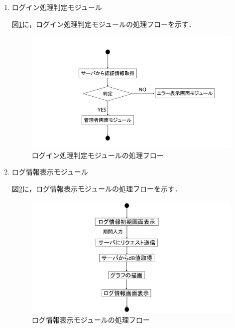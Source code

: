 \begin{enumerate}
\item ログイン処理判定モジュール

図\ref{fig;2-3}に，ログイン処理判定モジュールの処理フローを示す．

\begin{figure}[H]
	\begin{center}
	\includegraphics[width=15cm, bb=0 0 1000 540, clip]{./app_pic/app2-3.pdf}
	\caption{ログイン処理判定モジュールの処理フロー}
	\label{fig;2-3}
	\end{center}
\end{figure}

\item ログ情報表示モジュール

図\ref{fig;2-6}に，ログ情報表示モジュールの処理フローを示す．

\begin{figure}[H]
	\begin{center}
	\includegraphics[width=15cm, bb=0 0 1000 540, clip]{./app_pic/app2-6.pdf}
	\caption{ログ情報表示モジュールの処理フロー}
	\label{fig;2-6}
	\end{center}
\end{figure}


\end{enumerate}
